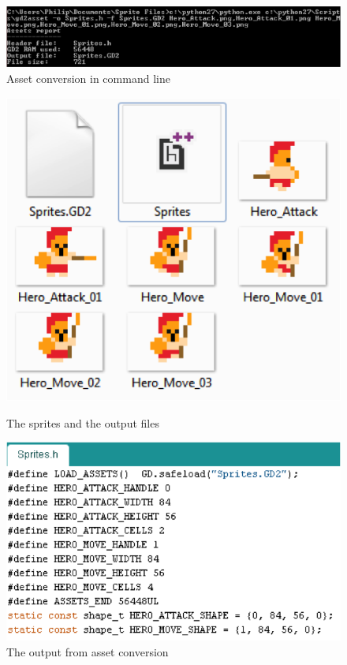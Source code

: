 \begin{figure}[h]
  \centering
  \includegraphics[scale=0.95]{Figures/Asset_cmd}
  \caption{Asset conversion in command line}
  \label{fig:asset_cmd}
\end{figure}


\begin{figure}[h]
\begin{minipage}[b]{0.45\linewidth}
  \centering
  \includegraphics[scale=0.7]{Figures/Asset_output}
  \caption{The sprites and the output files}
  \label{fig:Asset_output}
\end{minipage}
\hspace{0.5cm}
\begin{minipage}[b]{0.45\linewidth}
  \centering
  \includegraphics[scale=0.7]{Figures/SpritesHeader}
  \caption{The output from asset conversion}
  \label{fig:SpritesHeader}
\end{minipage}
\end{figure}


